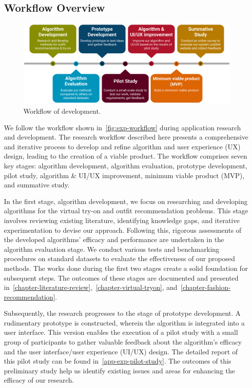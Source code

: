 \subsection{Workflow Overview}
\begin{figure}[h!]
  \centering
  \includegraphics[width=\textwidth]{content/resources/images/application/workflow.pdf}
  \caption{Workflow of development.}
  \label{fig:exp-workflow}
\end{figure}
We follow the workflow shown in~\autoref{fig:exp-workflow} during application research and development. The research workflow described here presents a comprehensive and iterative process to develop and refine algorithm and user experience (UX) design, leading to the creation of a viable product. The workflow comprises seven key stages: algorithm development, algorithm evaluation, prototype development, pilot study, algorithm \& UI/UX improvement, minimum viable product (MVP), and summative study.

In the first stage, algorithm development, we focus on researching and developing algorithms for the virtual try-on and outfit recommendation problems. This stage involves reviewing existing literature, identifying knowledge gaps, and iterative experimentation to devise our approach. Following this, rigorous assessments of the developed algorithms' efficacy and performance are undertaken in the algorithm evaluation stage. We conduct various tests and benchmarking procedures on standard datasets to evaluate the effectiveness of our proposed methods. The works done during the first two stages create a solid foundation for subsequent steps. The outcomes of these stages are documented and presented in~\autoref{chapter-literature-review},~\autoref{chapter-virtual-tryon}, and~\autoref{chapter-fashion-recommendation}.

Subsequently, the research progresses to the stage of prototype development. A rudimentary prototype is constructed, wherein the algorithm is integrated into a user interface. This version enables the execution of a pilot study with a small group of participants to gather valuable feedback about the algorithm's efficacy and the user interface/user experience (UI/UX) design. The detailed report of this pilot study can be found in~\autoref{app-exp-pilot-study}. The outcomes of this preliminary study help us identify existing issues and areas for enhancing the efficacy of our research.

